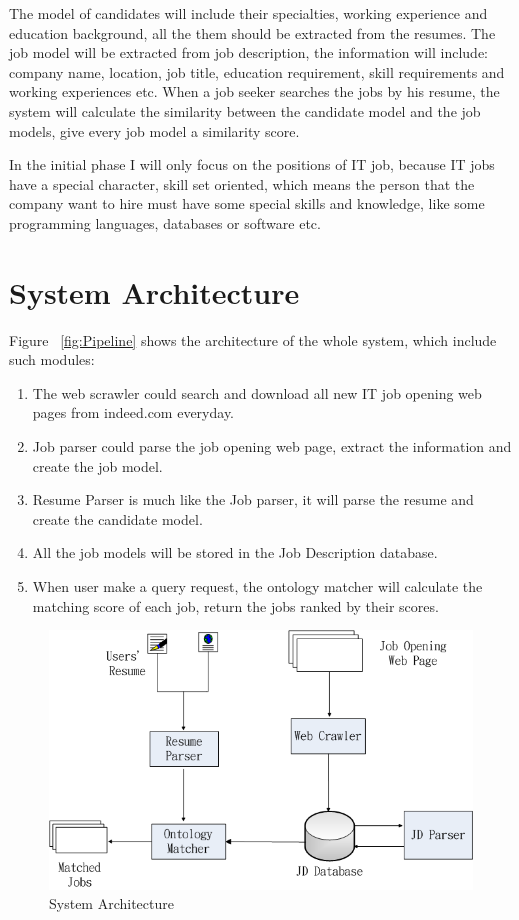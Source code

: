 The model of candidates will include their specialties, working experience and education background, all the them should be extracted from the resumes. The job model will be extracted from job description, the information will include: company name, location, job title, education requirement, skill requirements and working experiences etc. When a job seeker searches the jobs by his resume, the system will calculate the similarity between the candidate model and the job models, give every job model a similarity score.

In the initial phase I will only focus on the positions of IT job, because IT jobs have a special character,  skill set oriented, which means the person that the company want to hire must have some special skills and knowledge, like some programming languages, databases or software etc.

\section{System Architecture}

Figure ~\ref{fig:Pipeline} shows the architecture of the whole system, which include such modules:

\begin{enumerate}
    \item The web scrawler could search and download all new IT job opening web pages  from indeed.com everyday.
    \item Job parser could parse the job opening web page, extract the information and create the job model.
    \item Resume Parser is much like the Job parser, it will parse the resume and create the candidate model.
    \item All the job models will be stored in the Job Description database.
    \item When user make a query request, the ontology matcher will calculate the matching score of each job, return the jobs ranked by their scores.
\end{enumerate}

\begin{figure}[htbp]
  \centering
  \includegraphics[scale=0.5]{images/arch.png}
  \caption{System Architecture}
  \label{fig:arch}
\end{figure}

